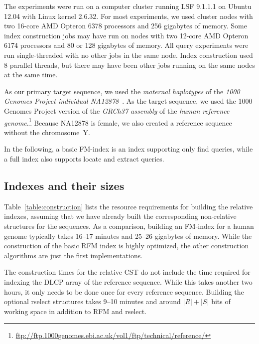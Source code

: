 \documentclass[a4paper,11pt]{llncs}
\newcommand{\abs}[1]{\ensuremath{\lvert #1 \rvert}}
\newcommand{\CST}{\textsf{CST}}
\newcommand{\RFM}{\textsf{RFM}}
\newcommand{\DLCP}{\textsf{DLCP}}
\newcommand{\rselect}{\textsf{rselect}}
\newcommand{\find}{\textsf{find}}
\newcommand{\locate}{\textsf{locate}}
\newcommand{\extract}{\textsf{extract}}
\begin{document}
The experiments were run on a computer cluster running LSF 9.1.1.1 on Ubuntu
12.04 with Linux kernel 2.6.32. For most experiments, we used cluster nodes
with two 16-core AMD Opteron 6378 processors and 256 gigabytes of memory. Some
index construction jobs may have run on nodes with two 12-core AMD Opteron
6174 processors and 80 or 128 gigabytes of memory. All query experiments were
run single-threaded with no other jobs in the same node. Index construction
used 8 parallel threads, but there may have been other jobs running on the
same nodes at the same time.

As our primary target sequence, we used the \emph{maternal haplotypes} of the
\emph{1000 Genomes Project individual NA12878}~\cite{Rozowsky2011}. As the
target sequence, we used the 1000 Genomes Project version of the \emph{GRCh37
assembly} of the \emph{human reference
genome}.\footnote{\url{ftp://ftp.1000genomes.ebi.ac.uk/vol1/ftp/technical/reference/}}
Because NA12878 is female, we also created a reference sequence without the
chromosome~Y.

In the following, a basic FM-index is an index supporting only \find{}
queries, while a full index also supports \locate{} and \extract{} queries.

\subsection{Indexes and their sizes}

Table~\ref{table:construction} lists the resource requirements for building
the relative indexes, assuming that we have already built the corresponding
non-relative structures for the sequences. As a comparison, building an
FM-index for a human genome typically takes 16--17 minutes and 25--26
gigabytes of memory. While the construction of the basic \RFM{} index is
highly optimized, the other construction algorithms are just the first
implementations.

The construction times for the relative \CST{} do not include the time
required for indexing the \DLCP{} array of the reference sequence. While this
takes another two hours, it only needs to be done once for every reference
sequence. Building the optional \rselect{} structures takes 9--10 minutes and
around $\abs{R} + \abs{S}$ bits of working space in addition to \RFM{} and
\rselect.
\end{document}
